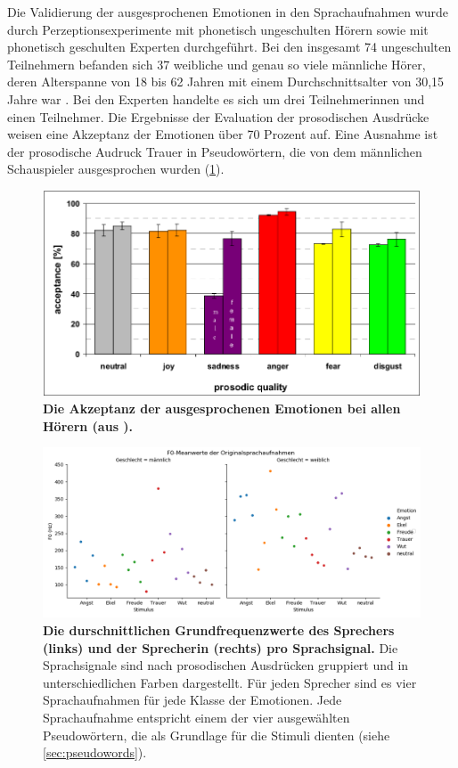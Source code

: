 \documentclass[11pt,a4paper,headsepline,twoside,toc=bibliography]{scrreprt}
\begin{document}
Die Validierung der ausgesprochenen Emotionen in den Sprachaufnahmen wurde durch Perzeptionsexperimente mit phonetisch ungeschulten Hörern sowie mit phonetisch geschulten Experten durchgeführt. Bei den insgesamt 74 ungeschulten Teilnehmern befanden sich 37 weibliche und genau so viele männliche Hörer, deren Alterspanne von 18 bis 62 Jahren mit einem Durchschnittsalter von 30,15 Jahre war \autocite[s. 104]{Wendt2007}. Bei den Experten handelte es sich um drei Teilnehmerinnen und einen Teilnehmer. Die Ergebnisse der Evaluation der prosodischen Ausdrücke weisen eine Akzeptanz der Emotionen über 70 Prozent auf. Eine Ausnahme ist der prosodische Audruck Trauer in Pseudowörtern, die von dem männlichen Schauspieler ausgesprochen wurden (\ref{fig:wasep_evaluation}).

\begin{figure}
	\centering
	\includegraphics[width=1\linewidth]{pics/wasep_evaluation.png}
	\caption{\textbf{Die Akzeptanz der ausgesprochenen Emotionen bei allen Hörern (aus \cite{Wendt2002}).}}
	\label{fig:wasep_evaluation}
\end{figure}


\begin{figure}
	\centering
	\includegraphics[width=1\linewidth]{plots/speaker_f0/speaker_f0.png}
	\caption{\textbf{Die durschnittlichen Grundfrequenzwerte des Sprechers (links) und der Sprecherin (rechts) pro Sprachsignal.} Die Sprachsignale sind nach prosodischen Ausdrücken gruppiert und in unterschiedlichen Farben dargestellt. Für jeden Sprecher sind es vier Sprachaufnahmen für jede Klasse der Emotionen. Jede Sprachaufnahme entspricht einem der vier ausgewählten Pseudowörtern, die als Grundlage für die Stimuli dienten (siehe \autoref{sec:pseudowords}). }
	\label{fig:speaker_f0}
\end{figure}
\end{document}

